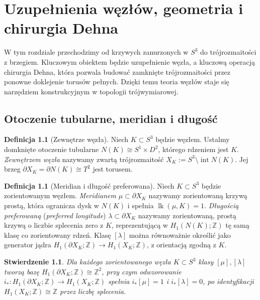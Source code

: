 \documentclass[11pt,a4paper]{report}
\numberwithin{equation}{section}
\theoremstyle{plain}
\newtheorem{stwierdzenie}[twierdzenie]{Stwierdzenie}
\theoremstyle{definition}
\newtheorem{definicja}[twierdzenie]{Definicja}
\theoremstyle{remark}
\begin{document}
\chapter{Uzupełnienia węzłów, geometria i chirurgia Dehna}
\label{ch:kt-chirurgia-3d}

W tym rozdziale przechodzimy od krzywych zanurzonych w $S^3$ do
trójrozmaitości z brzegiem. Kluczowym obiektem będzie uzupełnienie
węzła, a kluczową operacją chirurgia Dehna, która pozwala budować
zamknięte trójrozmaitości przez ponowne doklejenie torusów pełnych.
Dzięki temu teoria węzłów staje się narzędziem konstrukcyjnym
w topologii trójwymiarowej.

\section{Otoczenie tubularne, meridian i długość}
\label{sec:kt-peryferia}

\begin{definicja}[Zewnętrze węzła]
Niech $K\subset S^3$ będzie węzłem. Ustalmy domknięte otoczenie
tubularne $N(K)\cong S^1\times D^2$, którego rdzeniem jest $K$.
\emph{Zewnętrzem węzła} nazywamy zwartą trójrozmaitość
$X_K:=S^3\setminus\operatorname{int}N(K)$. Jej brzeg
$\partial X_K=\partial N(K)\cong T^2$ jest torusem.
\end{definicja}

\begin{definicja}[Meridian i długość preferowana]
Niech $K\subset S^3$ będzie zorientowanym węzłem.
\emph{Meridianem} $\mu\subset\partial X_K$ nazywamy
zorientowaną krzywą prostą, która ogranicza dysk
w $N(K)$ i spełnia $\operatorname{lk}(\mu,K)=1$.
\emph{Długością preferowaną} (\emph{preferred longitude})
$\lambda\subset\partial X_K$ nazywamy zorientowaną,
prostą krzywą o liczbie splecenia zero z $K$, reprezentującą
w $H_1(N(K);\mathbb Z)$ tę samą klasę co zorientowany rdzeń.
Klasę $[\lambda]$ można równoważnie określić jako generator
jądra $H_1(\partial X_K;\mathbb Z)\to H_1(X_K;\mathbb Z)$,
z orientacją zgodną z $K$.
\end{definicja}

\begin{stwierdzenie}
Dla każdego zorientowanego węzła $K\subset S^3$ klasy
$[\mu],[\lambda]$ tworzą bazę $H_1(\partial X_K;\mathbb Z)
\cong\mathbb Z^2$, przy czym odwzorowanie
$i_*\colon H_1(\partial X_K;\mathbb Z)\to H_1(X_K;\mathbb Z)$
spełnia $i_*[\mu]=1$ i $i_*[\lambda]=0$, po identyfikacji
$H_1(X_K;\mathbb Z)\cong\mathbb Z$ przez liczbę splecenia.
\end{stwierdzenie}
\end{document}
